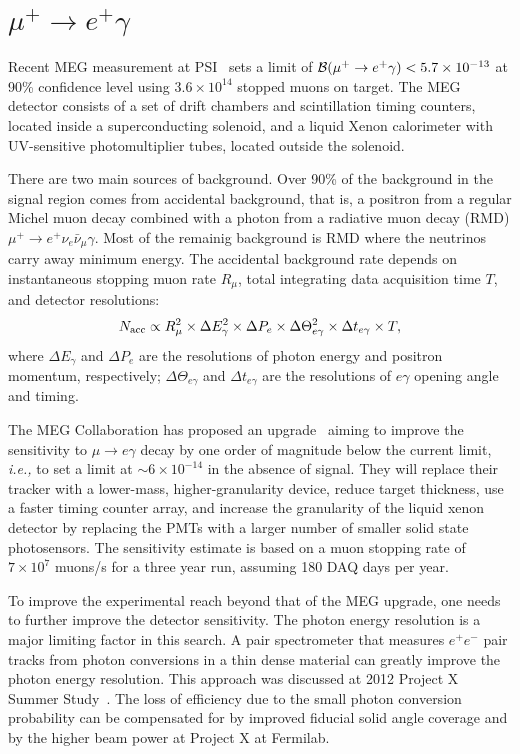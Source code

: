 \section{$\mu^+\to e^+\gamma$}

Recent MEG measurement at PSI~\cite{MEG2013} sets a limit of 
${\cal B}(\mu^+\to e^+\gamma)< 5.7\times 10^{-13}$ at 90\% confidence
level using $3.6\times 10^{14}$ stopped muons on target. The MEG detector
consists of a set of drift chambers and scintillation timing counters,
located inside a superconducting solenoid, and a liquid Xenon 
calorimeter with UV-sensitive photomultiplier tubes, located outside the
solenoid. 

There are two main sources of background. Over 90\% of the background in
the signal region comes from accidental background, that is, a positron
from a regular Michel muon decay combined with a photon from a radiative
muon decay  (RMD) $\mu^+\to e^+ \nu_e\bar\nu_\mu \gamma$.
Most of the remainig background is RMD where the neutrinos carry away minimum
energy. The accidental background rate depends on instantaneous stopping
muon rate $R_\mu$, total integrating data acquisition time $T$, and 
detector resolutions:
\begin{equation}
N_{\rm acc} \propto R_\mu^2 \times \Delta E_\gamma^2 \times\Delta P_e \times
\Delta \Theta_{e\gamma}^2 \times \Delta t_{e \gamma} \times T, 
\end{equation}
where $\Delta E_\gamma$ and $\Delta P_e$ are the resolutions of photon energy
and positron momentum, respectively; $\Delta \Theta_{e\gamma}$ and
$\Delta t_{e \gamma}$ are the resolutions of $e\gamma$ opening angle and
timing.

The MEG Collaboration has proposed an upgrade~\cite{MEGupgrade} aiming to 
improve the sensitivity to $\mu\to e\gamma$ decay 
by one order of magnitude below the current limit, {\it i.e.,} to set a limit at
$\sim 6\times 10^{-14}$ in the absence of signal. They will replace 
their tracker with a lower-mass, higher-granularity device, reduce target
thickness, use a faster timing counter array, and increase the 
granularity of the liquid xenon detector by replacing the PMTs with 
a larger number of smaller solid state photosensors. The sensitivity
estimate is based on a muon stopping rate of $7\times 10^7$ muons/s for 
a three year run, assuming 180 DAQ days per year.

To improve the experimental reach beyond that of the MEG upgrade, one needs to further improve the detector 
sensitivity. 
The photon energy resolution is a major limiting factor in this search.
A pair spectrometer that measures $e^+e^-$ pair tracks from photon
conversions in a thin dense material can greatly improve the photon energy
resolution. This approach was discussed at  2012 Project X Summer Study~\cite{Fritz}. The loss of efficiency due to the small photon conversion 
probability can be compensated for by improved fiducial solid angle coverage and by the higher beam power at Project X at 
Fermilab. 

